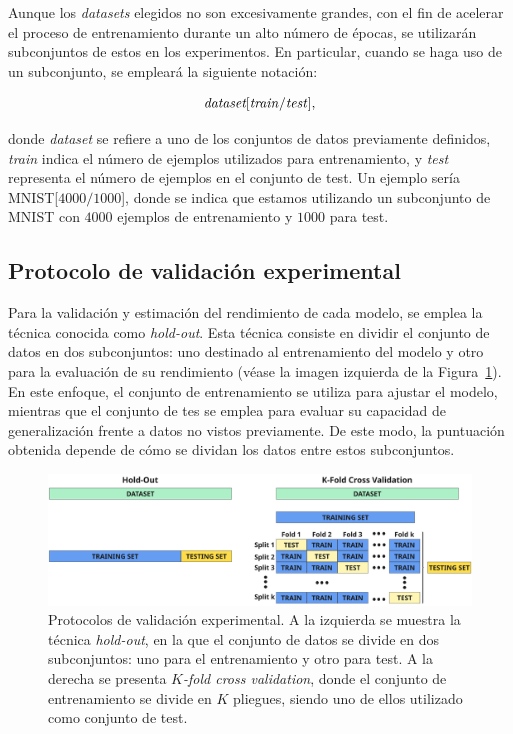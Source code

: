 Aunque los \textit{datasets} elegidos no son excesivamente grandes, con el fin de acelerar el proceso de entrenamiento durante un alto número de épocas, se utilizarán subconjuntos de estos en los experimentos. En particular, cuando se haga uso de un subconjunto, se empleará la siguiente notación:

\[
    \textit{dataset}[\text{\textit{train}/\textit{test}}],
\]

donde \textit{dataset} se refiere a uno de los conjuntos de datos previamente definidos, \textit{train} indica el número de ejemplos utilizados para entrenamiento, y \textit{test} representa el número de ejemplos en el conjunto de test. Un ejemplo sería MNIST[$4000/1000$], donde se indica que estamos utilizando un subconjunto de MNIST con $4000$ ejemplos de entrenamiento y $1000$ para test.

\subsection{Protocolo de validación experimental}\label{subsec:protocolo-experimental}

Para la validación y estimación del rendimiento de cada modelo, se emplea la técnica conocida como \textit{hold-out}. Esta técnica consiste en dividir el conjunto de datos en dos subconjuntos: uno destinado al entrenamiento del modelo y otro para la evaluación de su rendimiento (véase la imagen izquierda de la Figura~\ref{fig:protocolos}). En este enfoque, el conjunto de entrenamiento se utiliza para ajustar el modelo, mientras que el conjunto de tes se emplea para evaluar su capacidad de generalización frente a datos no vistos previamente. De este modo, la puntuación obtenida depende de cómo se dividan los datos entre estos subconjuntos.

\begin{figure}[h]
    \centering
    \includegraphics[width=0.8\linewidth]{img/protocolo-experimental.png}
    \caption[Protocolos de validación experimental.]{Protocolos de validación experimental. A la izquierda se muestra la técnica \textit{hold-out}, en la que el conjunto de datos se divide en dos subconjuntos: uno para el entrenamiento y otro para test. A la derecha se presenta \textit{$K$-fold cross validation}, donde el conjunto de entrenamiento se divide en $K$ pliegues, siendo uno de ellos utilizado como conjunto de test.}\label{fig:protocolos}
\end{figure}

